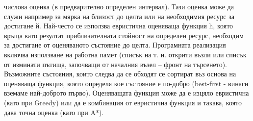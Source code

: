 \documentclass{article}
\begin{document}
числова оценка (в предварително определен интервал). Тази оценка може да служи например за мярка на близост до целта или на
необходимия ресурс за достигане й. Най-често се използва евристична оценяваща функция h, която връща като резултат приблизителната
стойност на определен ресурс, необходим за достигане от оценяваното състояние до целта. \newline\newline
Програмната реализация включва използване на работна памет (списък на т. н. открити възли или списък от изминати пътища, започващи от началния
възел – фронт на търсенето). Възможните състояния, които следва да се обходят се сортират въз основа на оценяваща функция, която
определя кое състояние е по-добро (best-first - винаги вземаме най-доброто първо). Оценяващата функция може да е изцяло евристична
(като при Greedy) или да е комбинация от евристична функция и такава, която дава точна оценка (като при A*).
\end{document}
